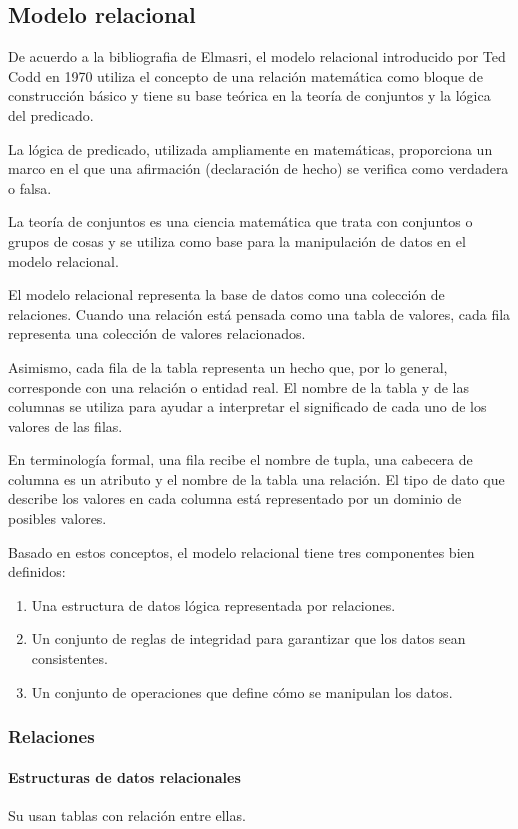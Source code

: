 \subsection{Modelo relacional}

De acuerdo a la bibliografia de Elmasri\cite{ramez_elmasri_fundamentos_nodate}, el modelo relacional introducido por Ted Codd en 1970\cite{codd_relational_nodate} utiliza el concepto de una relación matemática como bloque de construcción básico y tiene su base teórica en la teoría de conjuntos y la lógica del predicado.

La lógica de predicado, utilizada ampliamente en matemáticas, proporciona un marco en el que una afirmación (declaración de hecho) se verifica como verdadera o falsa.


La teoría de conjuntos es una ciencia matemática que trata con conjuntos o grupos de cosas y se utiliza como base para la manipulación de datos en el modelo relacional.


El modelo relacional representa la base de datos como una colección de relaciones. Cuando una relación está pensada como una tabla de valores, cada fila representa una colección de valores relacionados.


Asimismo, cada fila de la tabla representa un hecho que, por lo general, corresponde con una relación o entidad real. El nombre de la tabla y de las columnas se utiliza para ayudar a interpretar el significado de cada uno de los valores de las filas.


En terminología formal, una fila recibe el nombre de tupla, una cabecera de columna es un atributo y el nombre de la tabla una relación. El tipo de dato que describe los valores en cada columna está representado por un dominio de posibles valores. 


Basado en estos conceptos, el modelo relacional tiene tres componentes bien definidos:
\begin{enumerate}
    \item Una estructura de datos lógica representada por relaciones.
    \item Un conjunto de reglas de integridad para garantizar que los datos sean consistentes.
    \item Un conjunto de operaciones que define cómo se manipulan los datos.
\end{enumerate}
\subsubsection{Relaciones}
\paragraph*{Estructuras de datos relacionales}
Su usan tablas con relación entre ellas.
